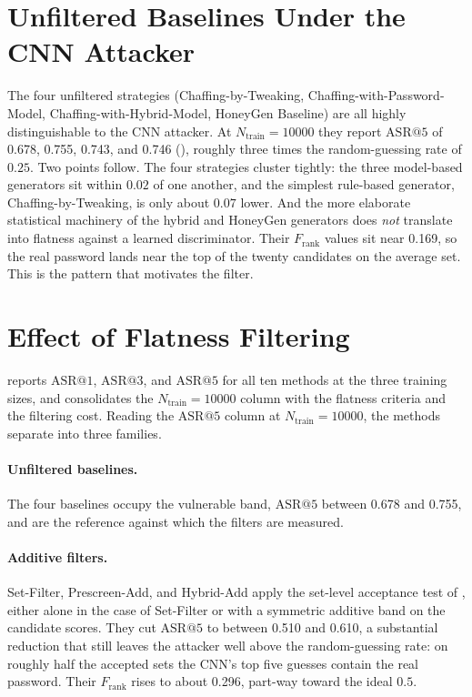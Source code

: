 

\section{Unfiltered Baselines Under the CNN Attacker}
\label{sec:results-baseline}

The four unfiltered strategies (Chaffing-by-Tweaking,
Chaffing-with-Password-Model, Chaffing-with-Hybrid-Model, HoneyGen
Baseline) are all highly distinguishable to the CNN attacker. At
$N_{\text{train}} = 10000$ they report $\mathrm{ASR}@5$ of 0.678, 0.755,
0.743, and 0.746 (), roughly three times the
random-guessing rate of $0.25$. Two points follow. The four strategies
cluster tightly: the three model-based generators sit within $0.02$ of
one another, and the simplest rule-based generator,
Chaffing-by-Tweaking, is only about $0.07$ lower. And the more elaborate
statistical machinery of the hybrid and HoneyGen generators does
\emph{not} translate into flatness against a learned discriminator.
Their $F_{\text{rank}}$ values sit near 0.169, so the real password
lands near the top of the twenty candidates on the average set. This is
the pattern that motivates the filter.

\section{Effect of Flatness Filtering}
\label{sec:results-filter}

 reports $\mathrm{ASR}@1$, $\mathrm{ASR}@3$, and
$\mathrm{ASR}@5$ for all ten methods at the three training sizes, and
 consolidates the $N_{\text{train}} = 10000$
column with the flatness criteria and the filtering cost. Reading the
$\mathrm{ASR}@5$ column at $N_{\text{train}} = 10000$, the methods
separate into three families.



\paragraph{Unfiltered baselines.}
The four baselines occupy the vulnerable band, $\mathrm{ASR}@5$ between
0.678 and 0.755, and are the reference against which the filters are
measured.

\paragraph{Additive filters.}
Set-Filter, Prescreen-Add, and Hybrid-Add apply the set-level acceptance
test of , either alone in the case of
Set-Filter or with a symmetric additive band on the candidate scores.
They cut $\mathrm{ASR}@5$ to between 0.510 and 0.610, a substantial
reduction that still leaves the attacker well above the random-guessing
rate: on roughly half the accepted sets the CNN's top five guesses
contain the real password. Their $F_{\text{rank}}$ rises to about 0.296,
part-way toward the ideal $0.5$.

